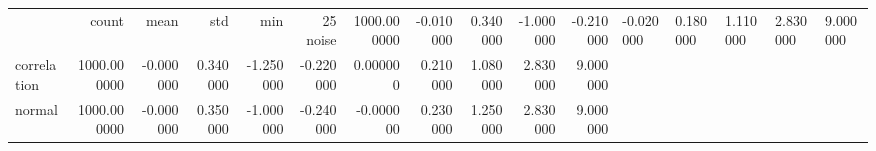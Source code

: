 \begin{tabular}{lrrrrrrrrrr}
\toprule
 & count & mean & std & min & 25%
\midrule
noise & 1000.000000 & -0.010000 & 0.340000 & -1.000000 & -0.210000 & -0.020000 & 0.180000 & 1.110000 & 2.830000 & 9.000000 \\
correlation & 1000.000000 & -0.000000 & 0.340000 & -1.250000 & -0.220000 & 0.000000 & 0.210000 & 1.080000 & 2.830000 & 9.000000 \\
normal & 1000.000000 & -0.000000 & 0.350000 & -1.000000 & -0.240000 & -0.000000 & 0.230000 & 1.250000 & 2.830000 & 9.000000 \\
\bottomrule
\end{tabular}
